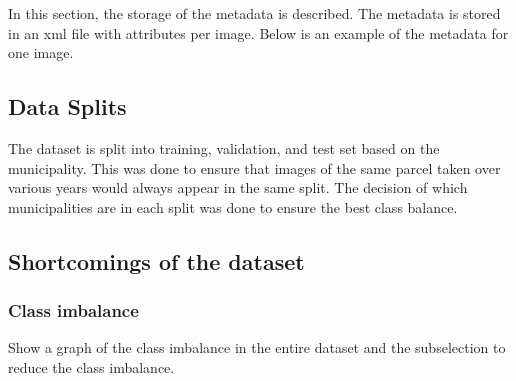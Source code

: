 In this section, the storage of the metadata is described. The metadata is stored in an xml file with attributes per image.
Below is an example of the metadata for one image. 

\subsection{Data Splits}

The dataset is split into training, validation, and test set based on the municipality. This was done to ensure that images of the same parcel taken over various years would always appear in the same split. The decision of which municipalities are in each split was done to ensure the best class balance.


\subsection{Shortcomings of the dataset}
\subsubsection{Class imbalance}

Show a graph of the class imbalance in the entire dataset and the subselection to reduce the class imbalance.


\cleardoublepage

